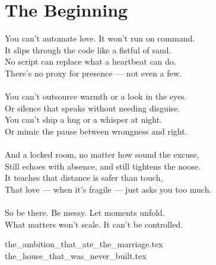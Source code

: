 \part{The Beginning}

\vfill

\begin{flushright}
\Large
You can’t automate love. It won’t run on command. \\ 
It slips through the code like a fistful of sand. \\
No script can replace what a heartbeat can do. \\
There's no proxy for presence --- not even a few. \\
\ \\
You can’t outsource warmth or a look in the eyes. \\
Or silence that speaks without needing disguise. \\
You can’t ship a hug or a whisper at night.\\
Or mimic the pause between wrongness and right. \\
\ \\
And a locked room, no matter how sound the excuse, \\
Still echoes with absence, and still tightens the noose. \\
It teaches that distance is safer than touch, \\
That love --- when it's fragile --- just asks you too much. \\
\ \\
So be there. Be messy. Let moments unfold.\\
What matters won't scale. It can’t be controlled.
\end{flushright}

{the_ambition_that_ate_the_marriage.tex}
{the_house_that_was_never_built.tex}


